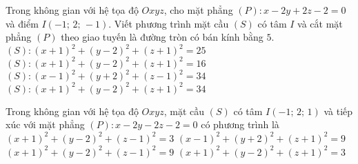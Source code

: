\begin{ex}%
	Trong không gian với hệ tọa độ $Oxyz$, cho mặt phẳng $\left( P \right)\colon x-2y+2z-2=0$ và điểm $I\left( -1;\,2;\,-1 \right)$. Viết phương trình mặt cầu $\left( S \right)$ có tâm $I$ và cắt mặt phẳng $\left( P \right)$ theo giao tuyến là đường tròn có bán kính bằng $5$.
	\choice
	{$\left( S \right)\colon\left( x+1 \right)^2+\left( y-2 \right)^2+\left( z+1 \right)^2=25$}
	{$\left( S \right)\colon\left( x+1 \right)^2+\left( y-2 \right)^2+\left( z+1 \right)^2=16$}
	{$\left( S \right)\colon\left( x-1 \right)^2+\left( y+2 \right)^2+\left( z-1 \right)^2=34$}
	{\True $\left( S \right)\colon\left( x+1 \right)^2+\left( y-2 \right)^2+\left( z+1 \right)^2=34$}
\end{ex}

\begin{ex}%
	Trong không gian với hệ tọa độ $Oxyz$, mặt cầu $\left( S \right)$ có tâm $I\left( -1;\,2;\,1 \right)$ và tiếp xúc với mặt phẳng $\left( P \right)\colon x-2y-2z-2=0$ có phương trình là
	\choice
	{$\left( x+1 \right)^2+\left( y-2 \right)^2+\left( z-1 \right)^2=3$}
	{$\left( x-1 \right)^2+\left( y+2 \right)^2+\left( z+1 \right)^2=9$}
	{\True $\left( x+1 \right)^2+\left( y-2 \right)^2+\left( z-1 \right)^2=9$}
	{$\left( x+1 \right)^2+\left( y-2 \right)^2+\left( z+1 \right)^2=3$}
\end{ex}

